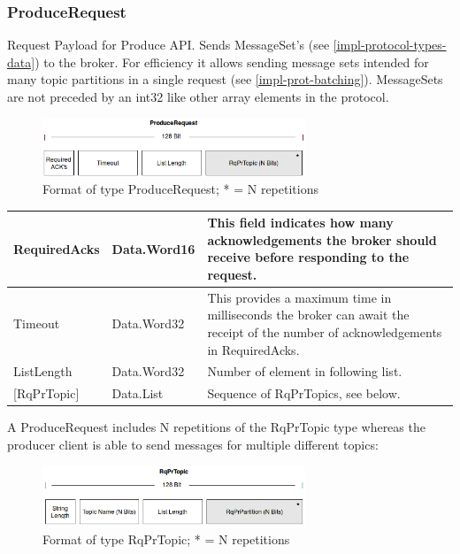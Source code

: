 \subsubsection{ProduceRequest}
\label{subsec:protocol-types-producerequest}

Request Payload for Produce API. Sends MessageSet's (see 
\ref{impl-protocol-types-data}) to the broker. For efficiency it allows sending
message sets intended for many topic partitions in a single request (see
\ref{impl-prot-batching}). MessageSets are not preceded by an int32 like other
array elements in the protocol.

\begin{figure}[H]
    \centering
    \includegraphics[width=0.7\textwidth]{images/impl-prot-types-produceRequest.png}
    \caption{Format of type ProduceRequest; * = N repetitions }
    \label{fig:impl-prot-types-produceRequest}
\end{figure}

\begin{table}[H]
\centering
\begin{tabular}{ l  l  p{10cm} }
\hline
RequiredAcks  & Data.Word16 & This field indicates how many acknowledgements the broker should receive before responding to the request.                       \\ \hline
Timeout       & Data.Word32 & This provides a maximum time in milliseconds the broker can await the receipt of the number of acknowledgements in RequiredAcks. \\ \hline
ListLength    & Data.Word32 & Number of element in following list.                                                                                             \\ \hline
{[}RqPrTopic{]} & Data.List   & Sequence of RqPrTopics, see below.                                                                                                  \\ \hline
\end{tabular}
\end{table}

A ProduceRequest includes N repetitions of the RqPrTopic type whereas the producer
client is able to send messages for multiple different topics:

\begin{figure}[H]
    \centering
    \includegraphics[width=0.7\textwidth]{images/impl-prot-types-prTopic.png}
    \caption{Format of type RqPrTopic; * = N repetitions }
    \label{fig:impl-prot-types-produceRequest}
\end{figure}

